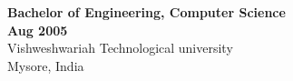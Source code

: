 \documentclass{article}
\begin{document}
\begin{minipage}[t]{3.4in}
    {\bf Bachelor of Engineering, Computer Science} \\
    {\bf Aug 2005} \\
    Vishweshwariah Technological university \\
    Mysore, India
    
\end{minipage}
\end{document}
